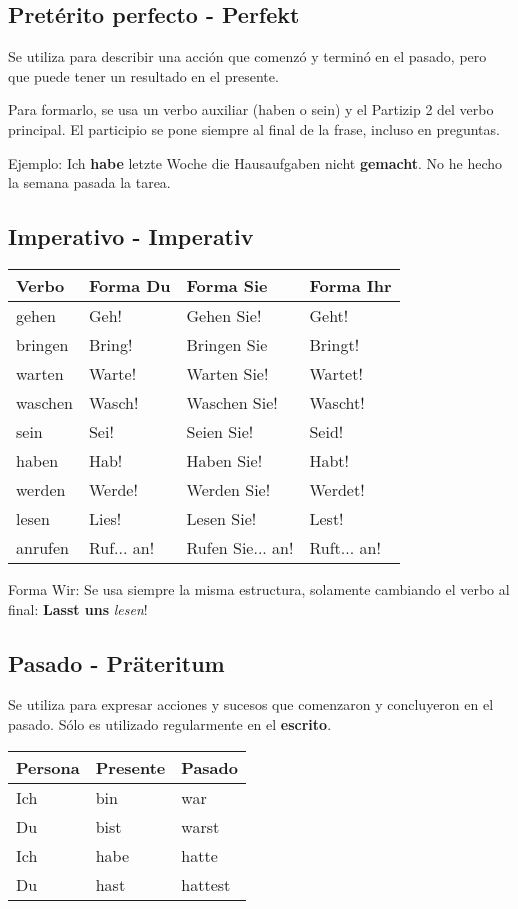 \subsection{Pretérito perfecto - Perfekt}
Se utiliza para describir una acción que comenzó y terminó en el pasado, pero que puede tener un resultado en el presente.

Para formarlo, se usa un verbo auxiliar (haben o sein) y el Partizip 2 del verbo principal. El participio se pone siempre al final de la frase, incluso en preguntas.

Ejemplo: Ich \textbf{habe} letzte Woche die Hausaufgaben nicht \textbf{gemacht}. No he hecho la semana pasada la tarea.

\subsection{Imperativo - Imperativ}
\begin{tabular}{|l | l l l |}
\hline
\textbf{Verbo} & \textbf{Forma Du} & \textbf{Forma Sie} & \textbf{Forma Ihr}\\
\hline
gehen 	& Geh! 		 & Gehen Sie! 		& Geht! \\
bringen & Bring! 	 & Bringen Sie 		& Bringt! \\
warten 	& Warte! 	 & Warten Sie! 		& Wartet! \\
waschen & Wasch! 	 & Waschen Sie! 	& Wascht! \\
sein 	& Sei! 		 & Seien Sie! 		& Seid! \\
haben 	& Hab! 		 & Haben Sie! 		& Habt! \\
werden 	& Werde! 	 & Werden Sie! 		& Werdet! \\
lesen 	& Lies! 	 & Lesen Sie! 		& Lest! \\
anrufen & Ruf... an! & Rufen Sie... an! & Ruft... an!\\
\hline
\end{tabular}

Forma Wir: Se usa siempre la misma estructura, solamente cambiando el verbo al final: \textbf{Lasst uns} \textit{lesen}!



\subsection{Pasado - Präteritum}
Se utiliza para expresar acciones y sucesos que comenzaron y concluyeron en el pasado. Sólo es utilizado regularmente en el \textbf{escrito}.

\begin{tabular}{| l | l l |}
\hline
\textbf{Persona} & \textbf{Presente} & \textbf{Pasado}\\
\hline
Ich & bin & war \\
Du & bist & warst \\
Ich & habe & hatte \\
Du & hast & hattest \\
\hline
\end{tabular}

